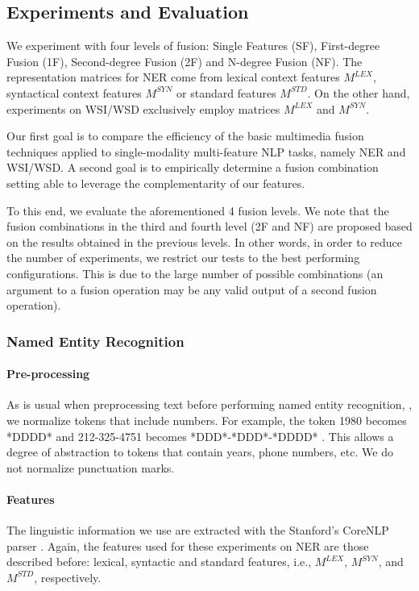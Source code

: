 \subsection{Experiments and Evaluation}
\label{chap6:expes}

We experiment with four levels of fusion: Single Features (SF), First-degree Fusion (1F), Second-degree Fusion (2F) and N-degree Fusion (NF). The representation matrices for NER come from lexical context features $M^{LEX}$, syntactical context features $M^{SYN}$ or standard features $M^{STD}$.  On the other hand, experiments on WSI/WSD exclusively employ matrices $M^{LEX}$ and $M^{SYN}$.

Our first goal is to compare the efficiency of the basic multimedia fusion techniques applied to  single-modality multi-feature NLP tasks, namely NER and WSI/WSD. A second goal is to empirically determine a fusion combination setting able to leverage the complementarity of our features.

To this end, we evaluate the aforementioned 4 fusion levels. We note that the fusion combinations in the third and fourth level (2F and NF) are proposed based on the results obtained in the previous levels. In other words, in order to reduce the number of experiments, we restrict our tests to the best performing configurations. This is due to the large number of possible combinations (an argument to a fusion operation may be any valid output of a second fusion operation).


\subsubsection{Named Entity Recognition}

\paragraph{Pre-processing}

As is usual when preprocessing text before performing named entity recognition, \cite{RatinovR09}, we normalize tokens that include numbers. For example, the token 1980 becomes *DDDD* and 212-325-4751 becomes *DDD*-*DDD*-*DDDD* . This allows a degree of abstraction to tokens that contain years, phone numbers, etc. We do not normalize punctuation marks.

\paragraph{Features}
The linguistic information we use are extracted with the Stanford's CoreNLP parser \cite{manning2014}. Again, the features used for these experiments on NER are those described before: lexical, syntactic and standard features, i.e., $M^{LEX}$, $M^{SYN}$, and $M^{STD}$, respectively. 

